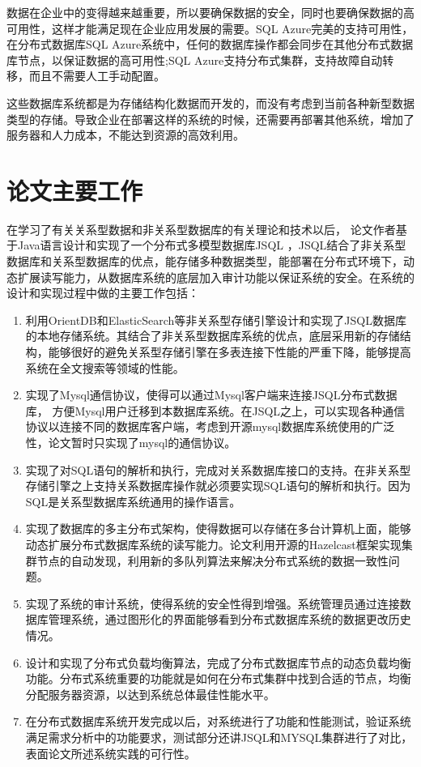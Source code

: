 	数据在企业中的变得越来越重要，所以要确保数据的安全，同时也要确保数据的高可用性，这样才能满足现在企业应用发展的需要。SQL Azure完美的支持可用性，在分布式数据库SQL Azure系统中，任何的数据库操作都会同步在其他分布式数据库节点，以保证数据的高可用性;SQL Azure支持分布式集群，支持故障自动转移，而且不需要人工手动配置。
	
	这些数据库系统都是为存储结构化数据而开发的，而没有考虑到当前各种新型数据类型的存储。导致企业在部署这样的系统的时候，还需要再部署其他系统，增加了服务器和人力成本，不能达到资源的高效利用。
\section{论文主要工作}
在学习了有关关系型数据和非关系型数据库的有关理论和技术以后，
论文作者基于Java语言设计和实现了一个分布式多模型数据库JSQL
，JSQL结合了非关系型数据库和关系型数据库的优点，能存储多种数据类型，能部署在分布式环境下，动态扩展读写能力，从数据库系统的底层加入审计功能以保证系统的安全。在系统的设计和实现过程中做的主要工作包括：
\begin{enumerate}[fullwidth,itemindent=2em]
	\item 利用OrientDB和ElasticSearch等非关系型存储引擎设计和实现了JSQL数据库的本地存储系统。其结合了非关系型数据库系统的优点，底层采用新的存储结构，能够很好的避免关系型存储引擎在多表连接下性能的严重下降，能够提高系统在全文搜索等领域的性能。
	\item 实现了Mysql通信协议，使得可以通过Mysql客户端来连接JSQL分布式数据库，
	方便Mysql用户迁移到本数据库系统。在JSQL之上，可以实现各种通信协议以连接不同的数据库客户端，考虑到开源mysql数据库系统使用的广泛性，论文暂时只实现了mysql的通信协议。
	\item 实现了对SQL语句的解析和执行，完成对关系数据库接口的支持。在非关系型存储引擎之上支持关系数据库操作就必须要实现SQL语句的解析和执行。因为SQL是关系型数据库系统通用的操作语言。
	\item 实现了数据库的多主分布式架构，使得数据可以存储在多台计算机上面，能够动态扩展分布式数据库系统的读写能力。论文利用开源的Hazelcast框架实现集群节点的自动发现，利用新的多队列算法来解决分布式系统的数据一致性问题。
	\item 实现了系统的审计系统，使得系统的安全性得到增强。系统管理员通过连接数据库管理系统，通过图形化的界面能够看到分布式数据库系统的数据更改历史情况。
	\item 设计和实现了分布式负载均衡算法，完成了分布式数据库节点的动态负载均衡功能。分布式系统重要的功能就是如何在分布式集群中找到合适的节点，均衡分配服务器资源，以达到系统总体最佳性能水平。
	\item 在分布式数据库系统开发完成以后，对系统进行了功能和性能测试，验证系统满足需求分析中的功能要求，测试部分还讲JSQL和MYSQL集群进行了对比，表面论文所述系统实践的可行性。
\end{enumerate}
